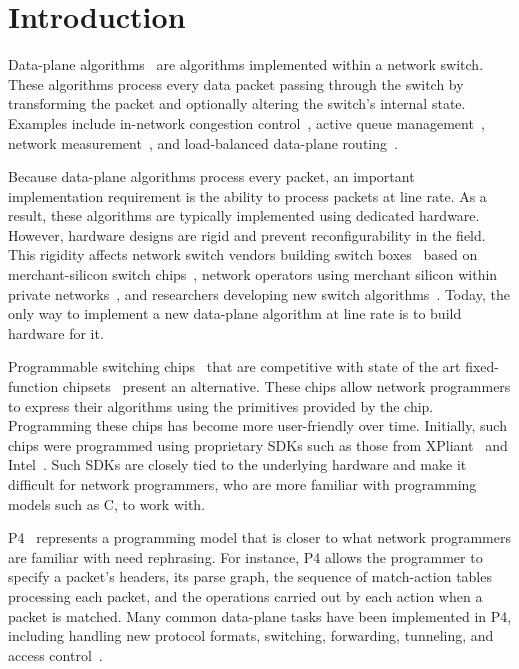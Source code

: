 \section{Introduction}
\label{s:intro}

Data-plane algorithms~\cite{cestan} are algorithms implemented within a network
switch. These algorithms process every data packet passing through the switch by
transforming the packet and optionally altering the switch's internal state.
Examples
include in-network congestion control~\cite{xcp, rcp, pdq, dctcp}, active queue
management~\cite{codel}, network measurement~\cite{opensketch, bitmap_george,
elephant_george}, and load-balanced data-plane routing~\cite{conga}.

Because data-plane algorithms process every packet, an important implementation
requirement is the ability to process packets at line rate.  As a result, these
algorithms are typically implemented using dedicated hardware. However,
hardware designs are rigid and prevent reconfigurability in the field. This
rigidity affects network switch vendors building switch
boxes~\cite{cisco_nexus, dell_force10, arista_7050} based on merchant-silicon
switch chips~\cite{trident, tomahawk, mellanox}, network operators using
merchant silicon within private networks~\cite{google,facebook,vl2}, and
researchers developing new switch algorithms~\cite{xcp, codel, d3, detail,
pdq}. Today, the only way to implement a new data-plane algorithm at line rate
is to build hardware for it.

Programmable switching chips~\cite{flexpipe, xpliant, rmt} that are competitive with
state of the art fixed-function chipsets~\cite{trident, tomahawk, mellanox}
present an alternative.  These chips allow network programmers to express their
algorithms using the primitives provided by the chip.  Programming these chips has
become more user-friendly over time. Initially, such chips were programmed
using proprietary SDKs such as those from XPliant~\cite{xpliant_sdk,
xpliant_sdk2} and Intel~\cite{intel_sdk}. Such SDKs are closely tied to the
underlying hardware and make it difficult for network programmers, who are more familiar
with programming models such as C, to work with.

P4~\cite{p4, p4spec} represents a programming model that is closer to 
what network programmers are familiar with \ac{need rephrasing}.
For instance, P4 allows the programmer to specify a packet's headers, its
parse graph, the sequence of match-action tables processing each
packet, and the operations carried out by each action when a packet is
matched. 
Many common data-plane tasks have been implemented in P4, including
handling new protocol
formats, switching, forwarding, tunneling, and access control~\cite{dc_p4}.

